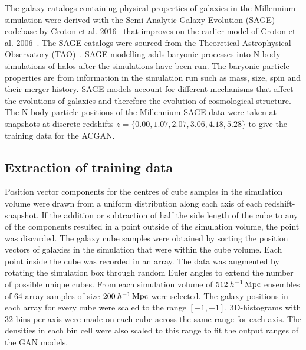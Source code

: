 \documentclass[twocolumn]{article}
\numberwithin{equation}{section}
\begin{document}
The galaxy catalogs containing physical properties of galaxies in the Millennium simulation were derived with the 
Semi-Analytic Galaxy Evolution (SAGE) codebase by Croton et al. 2016~\cite{Croton2016} that improves on the earlier 
model of Croton et al. 2006~\cite{Croton2006}. The SAGE catalogs were sourced from the Theoretical Astrophysical 
Observatory (TAO)~\cite{TAO}. SAGE modelling adds baryonic processes into N-body simulations of halos after the 
simulations have been run. The baryonic particle properties are from information in the simulation run such as mass, 
size, spin and their merger history. SAGE models account for different mechanisms that affect the evolutions of 
galaxies and therefore the evolution of cosmological structure. The N-body particle positions of the Millennium-SAGE 
data were taken at snapshots at discrete redshifts $z=\{0.00, 1.07, 2.07, 3.06, 4.18, 5.28\}$ to give the training 
data for the ACGAN. 


\subsection{Extraction of training data} 
Position vector components for the centres of cube samples in the simulation volume were drawn from a uniform distribution 
along each axis of each redshift-snapshot. If the addition or subtraction of half the side length of the cube to any of 
the components resulted in a point outside of the simulation volume, the point was discarded. The galaxy cube samples were 
obtained by sorting the position vectors of galaxies in the simulation that were within the cube volume. Each point inside 
the cube was recorded in an array. The data was augmented by rotating the simulation box through random Euler angles to 
extend the number of possible unique cubes. From each simulation volume of $512 \: h^{-1} \,\textup{Mpc}$ ensembles of 64 
array samples of size $200 \: h^{-1} \,\textup{Mpc}$ were selected. The galaxy positions in each array for every cube were 
scaled to the range $[-1,+1]$. 3D-histograms with 32 bins per axis were made on each cube across the same range for each 
axis. The densities in each bin cell were also scaled to this range to fit the output ranges of the GAN models. 
\end{document}
